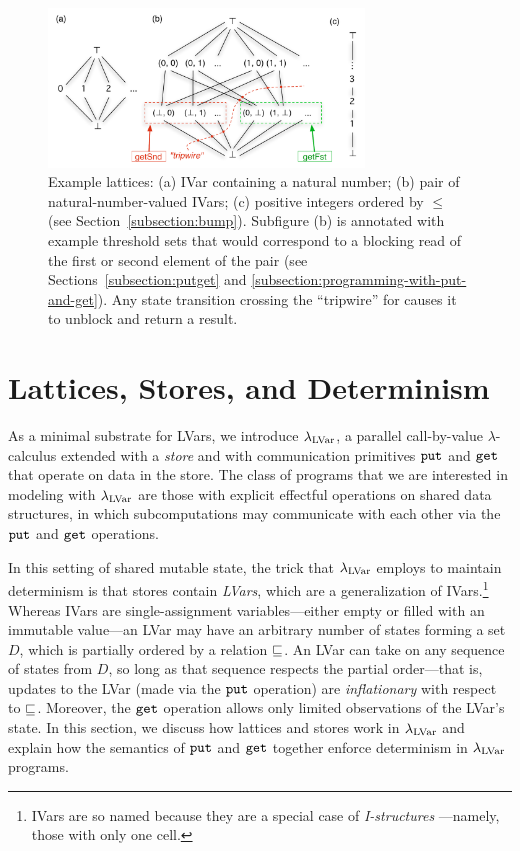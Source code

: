 
\begin{figure}[tb]
\centering
\includegraphics[width=3.3in,natwidth=633px,natheight=319px]{chapter2/figures/ExampleLattices2.pdf} 
  \caption{\footnotesize Example lattices: (a) IVar
    containing a natural number; (b) pair of natural-number-valued IVars; (c)
    positive integers ordered by $\leq$ (see Section~\ref{subsection:bump}).
    Subfigure (b) is annotated with example threshold
    sets that would correspond to a blocking read of the first or
    second element of the pair (see Sections~\ref{subsection:putget} and \ref{subsection:programming-with-put-and-get}).
    Any state transition crossing the
    ``tripwire'' for  causes it to unblock
    and return a result.}

  \label{f:lattice-examples}
\end{figure}

\section{Lattices, Stores, and Determinism}\label{section:domains}

As a minimal substrate for LVars, we introduce $\lambda_{\textrm{LVar}}$, 
 a parallel call-by-value
$\lambda$-calculus extended with a {\em store} and with communication
primitives $\mbox{\texttt{put}}$ and $\mbox{\texttt{get}}$ that operate on data in the store.
The class of programs that we are interested in modeling with
$\lambda_{\textrm{LVar}}$ are those with explicit effectful operations on shared
data
structures, in which subcomputations may communicate with each other
via the $\mbox{\texttt{put}}$ and
$\mbox{\texttt{get}}$ operations.

In this setting of shared mutable state, the trick
that $\lambda_{\textrm{LVar}}$ employs to maintain determinism is that stores
contain {\em LVars}, which are a generalization of
IVars.\footnote{IVars are so named because they are a
    special case of {\em I-structures} \cite{IStructures}---namely,
    those with only one cell.}
Whereas IVars are single-assignment
variables---either empty or filled with an immutable value---an LVar
may have an arbitrary number of states forming a set $D$, which is partially ordered by a relation 
$\sqsubseteq$.  An LVar can take on any sequence of states from 
$D$, so long as that sequence respects the partial order---that is,
updates to the LVar (made via the $\mbox{\texttt{put}}$ operation) are
\emph{inflationary} %
 with respect to $\sqsubseteq$.  Moreover, the 
 $\mbox{\texttt{get}}$ operation allows only limited observations of the LVar's state.  In
this section, we discuss how lattices and stores work in $\lambda_{\textrm{LVar}}$
and explain how the semantics of $\mbox{\texttt{put}}$ and $\mbox{\texttt{get}}$ together enforce determinism
in $\lambda_{\textrm{LVar}}$ programs.

